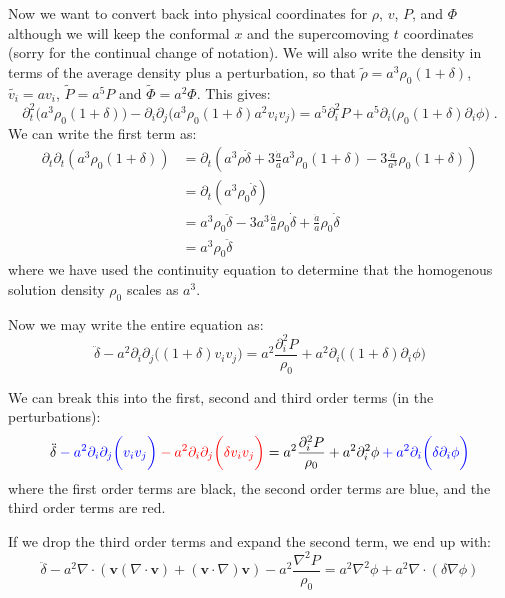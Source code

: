 \documentclass{article}
\newcommand{ \wt }{\widetilde}
\newcommand*{\mathcolor}{}
\def\mathcolor#1#{\mathcoloraux{#1}}
\newcommand*{\mathcoloraux}[3]{%
  \protect\leavevmode
  \begingroup
    \color#1{#2}#3%
  \endgroup
}
\begin{document}
Now we want to convert back into physical coordinates for $\rho$, $v$, $P$, and $\Phi$ although we will keep the conformal $x$ and the supercomoving $t$ coordinates (sorry for the continual change of notation).   We will also write the density in terms of the average density plus a perturbation, so that $\wt{\rho} = a^3 \rho_0 (1+\delta)$, $\wt{v_i} = a v_i$, $\wt{P} = a^5 P$ and $\wt{\Phi} = a^2 \Phi$.  This gives:
\begin{equation}
\partial_t^2 \bigg(a^3 \rho_0 (1+\delta) \bigg)
  - \partial_i \partial_j \bigg(a^3 \rho_0 (1+\delta) a^2 v_i
  v_j\bigg)  =  a^5 \partial_i^2 P + a^5 \partial_i \bigg(\rho_0 (1+\delta) \partial_i \phi \bigg)\;.
\end{equation}
We can write the first term as:
\begin{align*}
  \partial_t \partial_t ( a^3 \rho_0 (1+\delta) ) &= \partial_t( a^3 \rho \dot{\delta} + 3 \frac{\dot{a}}{a} a^3 \rho_0 (1+\delta) - 3 \frac{\dot{a}}{a^3} \rho_0 (1+\delta)) \\
&= \partial_t( a^3 \rho_0 \dot{\delta})\\
&= a^3 \rho_0 \ddot{\delta} - 3 a^3 \frac{\dot{a}}{a} \rho_0 \dot{\delta} + \frac{\dot{a}}{a} \rho_0 \dot{\delta} \\
&= a^3 \rho_0 \ddot{\delta} 
\end{align*}
where we have used the continuity equation to determine that the homogenous solution density $\rho_0$ scales as $a^3$.

Now we may write the entire equation as:
\begin{equation}
  \ddot{\delta} - a^2 \partial_i \partial_j \bigg((1+\delta) v_i v_j\bigg) =  a^2 \frac{\partial_i^2 P}{\rho_0} + a^2  \partial_i \bigg((1+\delta) \partial_i \phi \bigg)
\end{equation}

We can break this into the first, second and third order terms (in the
perturbations):
\begin{equation}
  \ddot{\delta}  \mathcolor{blue}{- a^2 \partial_i \partial_j \bigg(
    v_i v_j \bigg) }  \mathcolor{red}{-a^2 \partial_i \partial_j
    \bigg( \delta v_i v_j \bigg) } = a^2 \frac{\partial_i^2 P
  }{\rho_0}  + a^2 \partial_i^2 \phi  \mathcolor{blue}{+
    a^2 \partial_i \bigg( \delta \partial_i \phi \bigg) } 
\end{equation}
where the first order terms are black, the second order terms are
blue, and the third order terms are red.

If we drop the third order terms and expand the second term, we end
up with:
\begin{equation}
  \ddot{\delta} - a^2 \nabla \cdot ( \mathbf{v} ( \nabla \cdot
  \mathbf{v} ) + ( \mathbf{v} \cdot \nabla ) \mathbf{v} ) - a^2
  \frac{\nabla^2 P}{\rho_0} = a^2 \nabla^2 \phi + a^2 \nabla \cdot ( \delta
  \nabla \phi) 
\end{equation}
\end{document}
